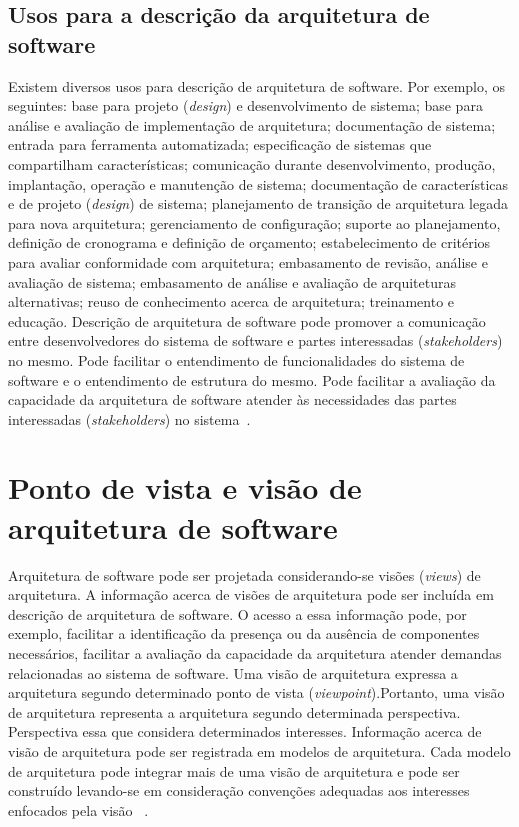 \subsection{Usos para a descrição da arquitetura de software}

Existem diversos usos para descrição de arquitetura de software. Por exemplo, os seguintes: base para projeto (\emph{design}) e desenvolvimento de sistema; base para análise e avaliação de implementação de arquitetura; documentação de sistema; entrada para ferramenta automatizada; especificação de sistemas que compartilham características; comunicação durante desenvolvimento, produção, implantação, operação e manutenção de sistema; documentação de características e de projeto (\emph{design}) de sistema; planejamento de transição de arquitetura legada para nova arquitetura; gerenciamento de configuração; suporte ao planejamento, definição de cronograma e definição de orçamento; estabelecimento de critérios para avaliar conformidade com arquitetura; embasamento de revisão, análise e avaliação de sistema; embasamento de análise e avaliação de arquiteturas alternativas; reuso de conhecimento acerca de arquitetura; treinamento e educação.
Descrição de arquitetura de software pode promover a comunicação entre desenvolvedores do sistema de software e partes interessadas (\emph{stakeholders}) no mesmo. Pode facilitar o entendimento de funcionalidades do sistema de software e o entendimento de estrutura do mesmo. Pode facilitar a avaliação da capacidade da arquitetura de software atender às necessidades das partes interessadas (\emph{stakeholders}) no sistema~\cite{ISO_42010}. 

\section{Ponto de vista e visão de arquitetura de software}
\label{sec:viewpoint}

Arquitetura de software pode ser projetada considerando-se visões (\emph{views}) de arquitetura. 
A informação acerca de visões de arquitetura pode ser incluída em descrição de arquitetura de software.
O acesso a essa informação pode, por exemplo, facilitar a identificação da presença ou da ausência de componentes necessários, facilitar a avaliação da capacidade da arquitetura atender demandas relacionadas ao sistema de software.
Uma visão de arquitetura expressa a arquitetura segundo determinado ponto de vista (\emph{viewpoint}).Portanto, uma visão de arquitetura representa a arquitetura segundo determinada perspectiva. Perspectiva essa que considera determinados interesses. Informação acerca de visão de arquitetura pode ser registrada em modelos de arquitetura. Cada modelo de arquitetura pode integrar mais de uma visão de arquitetura e pode ser construído levando-se em consideração convenções adequadas aos interesses enfocados pela visão  ~\cite{ISO_42010}.

